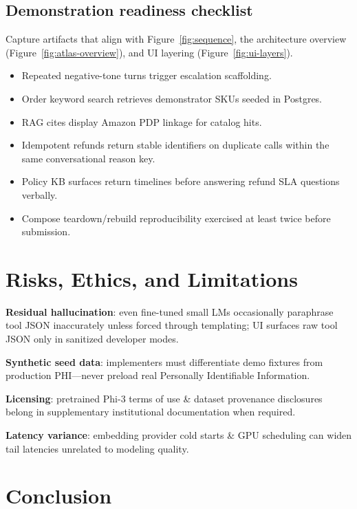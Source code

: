 \documentclass[11pt,a4paper,twoside]{report}
\begin{document}
\section{Demonstration readiness checklist}
Capture artifacts that align with Figure~\ref{fig:sequence}, the architecture overview (Figure~\ref{fig:atlas-overview}), and UI layering (Figure~\ref{fig:ui-layers}).

\begin{itemize}
\item Repeated negative-tone turns trigger escalation scaffolding.
\item Order keyword search retrieves demonstrator SKUs seeded in Postgres.
\item RAG cites display Amazon PDP linkage for catalog hits.
\item Idempotent refunds return stable identifiers on duplicate calls within the same conversational reason key.
\item Policy KB surfaces return timelines before answering refund SLA questions verbally.
\item Compose teardown/rebuild reproducibility exercised at least twice before submission.
\end{itemize}

\chapter{Risks, Ethics, and Limitations}

\textbf{Residual hallucination}: even fine-tuned small LMs occasionally paraphrase tool JSON inaccurately unless forced through templating; UI surfaces raw tool JSON only in sanitized developer modes.

\textbf{Synthetic seed data}: implementers must differentiate demo fixtures from production PHI—never preload real Personally Identifiable Information.

\textbf{Licensing}: pretrained Phi-3 terms of use \& dataset provenance disclosures belong in supplementary institutional documentation when required.

\textbf{Latency variance}: embedding provider cold starts \& GPU scheduling can widen tail latencies unrelated to modeling quality.

\chapter{Conclusion}
\end{document}
